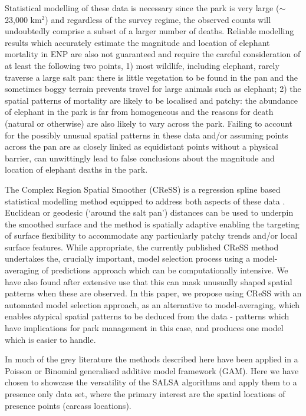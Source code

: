 \documentclass[letterpaper, 12pt]{interact}
\begin{document}
	Statistical modelling of these data is necessary since the park is very large ($\sim$23,000 km\(^2\)) and regardless of the survey regime, the observed counts will undoubtedly comprise a subset of a larger number of deaths. Reliable modelling results which accurately estimate the magnitude and location of elephant mortality in ENP are also not guaranteed and require the careful consideration of at least the following two points, 1) most wildlife, including elephant, rarely traverse a large salt pan: there is little vegetation to be found in the pan and the sometimes boggy terrain prevents travel for large animals such as elephant; 2) the spatial patterns of mortality are likely to be localised and patchy: the abundance of elephant in the park is far from homogeneous and the reasons for death (natural or otherwise) are also likely to vary across the park. Failing to account for the possibly unusual spatial patterns in these data and/or assuming points across the pan are as closely linked as equidistant points without a physical barrier, can unwittingly lead to false conclusions about the magnitude and location of elephant deaths in the park.
	
	The Complex Region Spatial Smoother (CReSS) is a regression spline based statistical modelling method equipped to address both aspects of these data  \cite{scott2014}. Euclidean or geodesic (`around the salt pan') distances can be used to underpin the smoothed surface and the method is spatially adaptive enabling the targeting of surface flexibility to accommodate any particularly patchy trends and/or local surface features. While appropriate, the currently published CReSS method \cite{scott2014} undertakes the, crucially important, model selection process using a model-averaging of predictions approach which can be computationally intensive. We have also found after extensive use that this can mask unusually shaped spatial patterns when these are observed. In this paper, we propose using CReSS with an automated model selection approach, as an alternative to model-averaging, which enables atypical spatial patterns to be deduced from the data - patterns which have implications for park management in this case, and produces one model which is easier to handle.
	
	In much of the grey literature the methods described here have been applied in a Poisson or Binomial generalised additive model framework (GAM).  Here we have chosen to showcase the versatility of the SALSA algorithms and apply them to a presence only data set, where the primary interest are the spatial locations of presence points (carcass locations).
	
\end{document}
